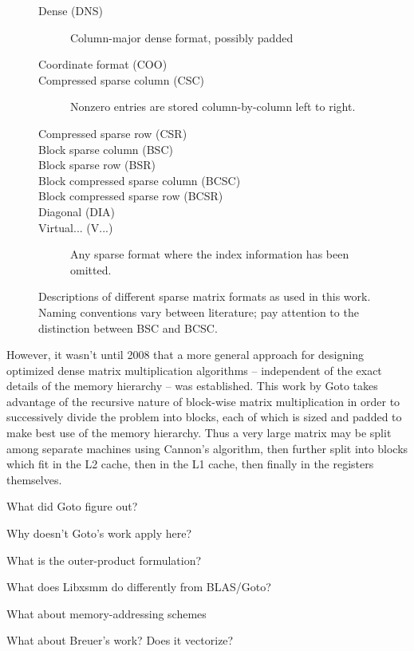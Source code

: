 \begin{figure}

\begin{description}
	\item[Dense (DNS)] Column-major dense format, possibly padded
	\item[Coordinate format (COO)] 
	\item[Compressed sparse column (CSC)] Nonzero entries are stored column-by-column left to right. 
	\item[Compressed sparse row (CSR)]
	\item[Block sparse column (BSC)]
	\item[Block sparse row (BSR)]
	\item[Block compressed sparse column (BCSC)]
	\item[Block compressed sparse row (BCSR)]
	\item[Diagonal (DIA)]
	\item[Virtual... (V...)] Any sparse format where the index information has been omitted.
\end{description}


\caption{Descriptions of different sparse matrix formats as used in this work. Naming conventions vary between literature; pay attention to the distinction between BSC and BCSC. }
\label{fig:formats}
\end{figure}

However, it wasn't until 2008 that a more general approach for designing optimized dense matrix multiplication algorithms -- independent of the exact details of the memory hierarchy -- was established. This work by Goto takes advantage of the recursive nature of block-wise matrix multiplication in order to successively divide the problem into blocks, each of which is sized and padded to make best use of the memory hierarchy. Thus a very large matrix may be split among separate machines using Cannon's algorithm, then further split into blocks which fit in the L2 cache, then in the L1 cache, then finally in the registers themselves. 


What did Goto figure out?

Why doesn't Goto's work apply here?

What is the outer-product formulation?

What does Libxsmm do differently from BLAS/Goto?

What about memory-addressing schemes

What about Breuer's work? Does it vectorize?

